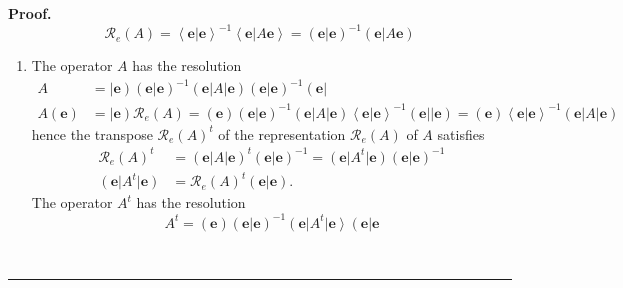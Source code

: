 \documentclass[aps,preprint]{revtex4}%
\newenvironment{proof}[1][Proof]{\noindent\textbf{#1.} }{\ \rule{0.5em}{0.5em}}
\begin{document}
\begin{proof}%
\begin{equation}
\mathcal{R}_{e}\left(  A\right)  =\left\langle \left.  \mathbf{e}\right\vert
\mathbf{e}\right\rangle ^{-1}\left\langle \left.  \mathbf{e}\right\vert
A\mathbf{e}\right\rangle =\left(  \left.  \mathbf{e}\right\vert \mathbf{e}%
\right)  ^{-1}\left(  \left.  \mathbf{e}\right\vert A\mathbf{e}\right)
\end{equation}


\begin{enumerate}
\item The operator $A$ has the resolution
\begin{align}
A  &  =\left\vert \mathbf{e}\right)  \left(  \left.  \mathbf{e}\right\vert
\mathbf{e}\right)  ^{-1}\left(  \mathbf{e}\right\vert A\left\vert
\mathbf{e}\right)  \left(  \left.  \mathbf{e}\right\vert \mathbf{e}\right)
^{-1}\left(  \mathbf{e}\right\vert \\
A\left(  \mathbf{e}\right)   &  =\left\vert \mathbf{e}\right)  \mathcal{R}%
_{e}\left(  A\right)  =\left(  \mathbf{e}\right)  \left(  \left.
\mathbf{e}\right\vert \mathbf{e}\right)  ^{-1}\left(  \mathbf{e}\right\vert
A\left\vert \mathbf{e}\right)  \left\langle \left.  \mathbf{e}\right\vert
\mathbf{e}\right\rangle ^{-1}\left(  \mathbf{e}\right\vert \left\vert
\mathbf{e}\right)  =\left(  \mathbf{e}\right)  \left\langle \left.
\mathbf{e}\right\vert \mathbf{e}\right\rangle ^{-1}\left(  \mathbf{e}%
\right\vert A\left\vert \mathbf{e}\right)
\end{align}
hence the transpose $\mathcal{R}_{e}\left(  A\right)  ^{t}$ of the
representation $\mathcal{R}_{e}\left(  A\right)  $ of $A$ satisfies
\begin{align}
\mathcal{R}_{e}\left(  A\right)  ^{t}  &  =\left(  \mathbf{e}\right\vert
A\left\vert \mathbf{e}\right)  ^{t}\left(  \left.  \mathbf{e}\right\vert
\mathbf{e}\right)  ^{-1}=\left(  \mathbf{e}\right\vert A^{t}\left\vert
\mathbf{e}\right)  \left(  \left.  \mathbf{e}\right\vert \mathbf{e}\right)
^{-1}\\
\left(  \mathbf{e}\right\vert A^{t}\left\vert \mathbf{e}\right)   &
=\mathcal{R}_{e}\left(  A\right)  ^{t}\left(  \left.  \mathbf{e}\right\vert
\mathbf{e}\right)  .
\end{align}
The operator $A^{t}$ has the resolution%
\begin{equation}
A^{t}=\left(  \mathbf{e}\right)  \left(  \left.  \mathbf{e}\right\vert
\mathbf{e}\right)  ^{-1}\left(  \mathbf{e}\right\vert A^{t}\left\vert
\mathbf{e}\right\rangle \left(  \left.  \mathbf{e}\right\vert \mathbf{e}%

\end{equation}
\end{enumerate}
\end{proof}
\end{document}
